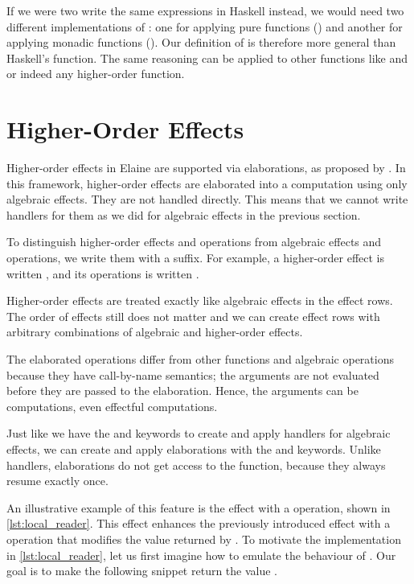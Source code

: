 If we were two write the same expressions in Haskell instead, we would need two different implementations of : one for applying pure functions () and another for applying monadic functions (). Our definition of  is therefore more general than Haskell's  function. The same reasoning can be applied to other functions like  and  or indeed any higher-order function.

\section{Higher-Order Effects}

Higher-order effects in Elaine are supported via elaborations, as proposed by \textcite{bach_poulsen_hefty_2023}. In this framework, higher-order effects are elaborated into a computation using only algebraic effects. They are not handled directly. This means that we cannot write handlers for them as we did for algebraic effects in the previous section.

To distinguish higher-order effects and operations from algebraic effects and operations, we write them with a \el{!} suffix. For example, a higher-order  effect is written , and its  operations is written .

Higher-order effects are treated exactly like algebraic effects in the effect rows. The order of effects still does not matter and we can create effect rows with arbitrary combinations of algebraic and higher-order effects.

The elaborated operations differ from other functions and algebraic operations because they have call-by-name semantics; the arguments are not evaluated before they are passed to the elaboration. Hence, the arguments can be computations, even effectful computations.

Just like we have the  and  keywords to create and apply handlers for algebraic effects, we can create and apply elaborations with the  and  keywords. Unlike handlers, elaborations do not get access to the  function, because they always resume exactly once.

An illustrative example of this feature is the  effect with a  operation, shown in \cref{lst:local_reader}. This effect enhances the previously introduced  effect with a  operation that modifies the value returned by . To motivate the implementation in \cref{lst:local_reader}, let us first imagine how to emulate the behaviour of . Our goal is to make the following snippet return the value .

